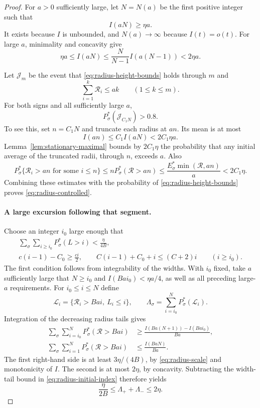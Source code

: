 \begin{proof}
For $a>0$ sufficiently large, let $N=N(a)$ be the first positive integer
such that
\[
  I(aN)\ge\eta a.
\]
It exists because $I$ is unbounded, and $N(a)\to\infty$ because
$I(t)=o(t)$.  For large $a$, minimality and concavity give
\begin{equation}
  \eta a\le I(aN)
  \le\frac{N}{N-1}I(a(N-1))<2\eta a.
  \label{eq:radius-scale}
\end{equation}

Let $\mathcal J_m$ be the event that
\eqref{eq:radius-height-bounds} holds through $m$ and
\[
  \sum_{i=1}^k\mathcal R_i\le ak\qquad(1\le k\le m).
\]
For both signs and all sufficiently large $a$,
\begin{equation}
  P_\sigma^*(\mathcal J_{C_1N})>0.8.
  \label{eq:radius-controlled}
\end{equation}
To see this, set $n=C_1N$ and truncate each radius at $an$.
Its mean is at most
\[
  I(an)\le C_1 I(aN)<2C_1\eta a.
\]
Lemma~\ref{lem:stationary-maximal} bounds by $2C_1\eta$ the probability
that any initial average of the truncated radii, through $n$, exceeds
$a$.  Also
\[
  P_\sigma^*\{\mathcal R_i>an\text{ for some }i\le n\}
  \le nP_\sigma^*(\mathcal R>an)
  \le\frac{E_\sigma^*\min(\mathcal R,an)}a
  <2C_1\eta.
\]
Combining these estimates with the probability of
\eqref{eq:radius-height-bounds} proves
\eqref{eq:radius-controlled}.

\paragraph{A large excursion following that segment.}
Choose an integer $i_0$ large enough that
\begin{equation}
\begin{gathered}
  \sum_\sigma\sum_{i\ge i_0}P_\sigma^*(L>i)<\frac{\eta}{4B},\\
  c(i-1)-C_0\ge\frac{ci}{2},\qquad
  C(i-1)+C_0+i\le(C+2)i\qquad(i\ge i_0).
\end{gathered}
\label{eq:radius-initial-index}
\end{equation}
The first condition follows from integrability of the widths.
With $i_0$ fixed, take $a$ sufficiently large that $N\ge i_0$ and
$I(Bai_0)<\eta a/4$, as well as all preceding large-$a$ requirements.
For $i_0\le i\le N$ define
\[
  \mathcal L_i=\{\mathcal R_i>Bai,\ L_i\le i\},\qquad
  \Lambda_\sigma=\sum_{i=i_0}^N P_\sigma^*(\mathcal L_i).
\]
Integration of the decreasing radius tails gives
\begin{align*}
  \sum_\sigma\sum_{i=i_0}^N P_\sigma^*(\mathcal R>Bai)
  &\ge\frac{I(Ba(N+1))-I(Bai_0)}{Ba},\\
  \sum_\sigma\sum_{i=1}^N P_\sigma^*(\mathcal R>Bai)
  &\le\frac{I(BaN)}{Ba}.
\end{align*}
The first right-hand side is at least $3\eta/(4B)$, by
\eqref{eq:radius-scale} and monotonicity of $I$.  The second is at most
$2\eta$, by concavity.  Subtracting the width-tail bound in
\eqref{eq:radius-initial-index} therefore yields
\begin{equation}
  \frac{\eta}{2B}\le\Lambda_++\Lambda_-\le2\eta.
  \label{eq:radius-large-excursion-mass}
\end{equation}


\end{proof}
